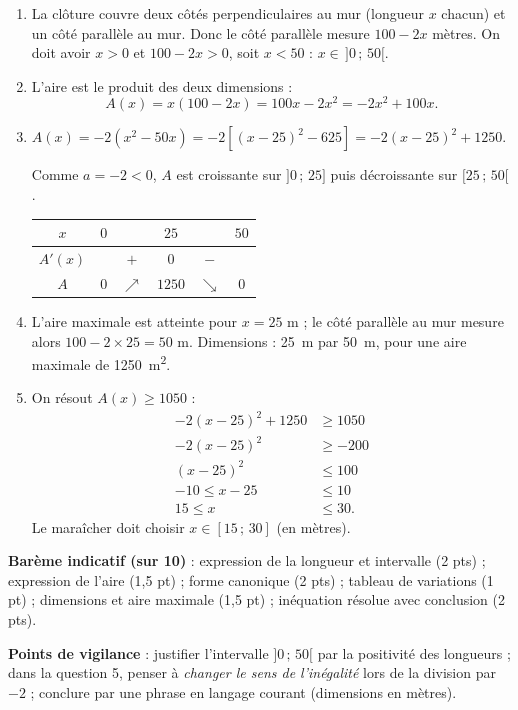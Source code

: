 \documentclass[11pt]{article}
\begin{document}
\begin{corrige}
\begin{enumerate}
\item La clôture couvre deux côtés perpendiculaires au mur (longueur $x$ chacun) et un côté parallèle au mur. Donc le côté parallèle mesure $100-2x$ mètres. On doit avoir $x>0$ et $100-2x>0$, soit $x<50$ : $x\in\,]0\,;\,50[$.
\item L'aire est le produit des deux dimensions :
\[A(x)=x(100-2x)=100x-2x^2=-2x^2+100x.\]
\item $A(x)=-2\left(x^2-50x\right)=-2\left[(x-25)^2-625\right]=-2(x-25)^2+1250$.\par
Comme $a=-2<0$, $A$ est croissante sur $]0\,;\,25]$ puis décroissante sur $[25\,;\,50[$.
\begin{center}
\begin{tabular}{|c|ccccc|}\hline
$x$ & $0$ & & $25$ & & $50$ \\ \hline
$A'(x)$ & & $+$ & $0$ & $-$ & \\ \hline
$A$ & $0$ & $\nearrow$ & $1250$ & $\searrow$ & $0$ \\ \hline
\end{tabular}
\end{center}
\item L'aire maximale est atteinte pour $x=25$ m ; le côté parallèle au mur mesure alors $100-2\times 25=50$ m. Dimensions : \SI{25}{m} par \SI{50}{m}, pour une aire maximale de \SI{1250}{m^2}.
\item On résout $A(x)\geq 1050$ :
\begin{align*}
-2(x-25)^2+1250 &\geq 1050\\
-2(x-25)^2 &\geq -200\\
(x-25)^2 &\leq 100\\
-10\leq x-25 &\leq 10\\
15\leq x &\leq 30.
\end{align*}
Le maraîcher doit choisir $x\in[15\,;\,30]$ (en mètres).
\end{enumerate}
\textbf{Barème indicatif (sur 10)} : expression de la longueur et intervalle (2 pts) ; expression de l'aire (1,5 pt) ; forme canonique (2 pts) ; tableau de variations (1 pt) ; dimensions et aire maximale (1,5 pt) ; inéquation résolue avec conclusion (2 pts).\par
\textbf{Points de vigilance} : justifier l'intervalle $]0\,;\,50[$ par la positivité des longueurs ; dans la question 5, penser à \emph{changer le sens de l'inégalité} lors de la division par $-2$ ; conclure par une phrase en langage courant (dimensions en mètres).
\end{corrige}
\end{document}
